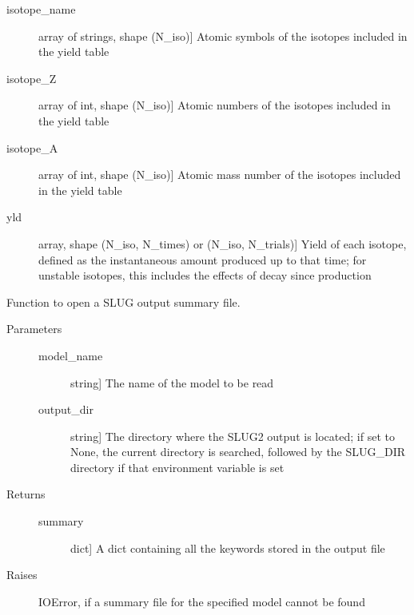 \documentclass[letterpaper,10pt,english]{sphinxmanual}
\begin{document}
\begin{fulllineitems}
\begin{description}
\begin{description}
\item[{isotope\_name}] \leavevmode{[}array of strings, shape (N\_iso){]}
Atomic symbols of the isotopes included in the yield table

\item[{isotope\_Z}] \leavevmode{[}array of int, shape (N\_iso){]}
Atomic numbers of the isotopes included in the yield table

\item[{isotope\_A}] \leavevmode{[}array of int, shape (N\_iso){]}
Atomic mass number of the isotopes included in the yield table

\item[{yld}] \leavevmode{[}array, shape (N\_iso, N\_times) or (N\_iso, N\_trials){]}
Yield of each isotope, defined as the instantaneous amount
produced up to that time; for unstable isotopes, this
includes the effects of decay since production

\end{description}

\end{description}

\end{fulllineitems}


\begin{fulllineitems}
\label{\detokenize{slugpy:slugpy.read_summary}}
Function to open a SLUG output summary file.
\begin{description}
\item[{Parameters}] \leavevmode\begin{description}
\item[{model\_name}] \leavevmode{[}string{]}
The name of the model to be read

\item[{output\_dir}] \leavevmode{[}string{]}
The directory where the SLUG2 output is located; if set to None,
the current directory is searched, followed by the SLUG\_DIR
directory if that environment variable is set

\end{description}

\item[{Returns}] \leavevmode\begin{description}
\item[{summary}] \leavevmode{[}dict{]}
A dict containing all the keywords stored in the output file

\end{description}

\item[{Raises}] \leavevmode
IOError, if a summary file for the specified model cannot be found

\end{description}

\end{fulllineitems}
\end{document}
